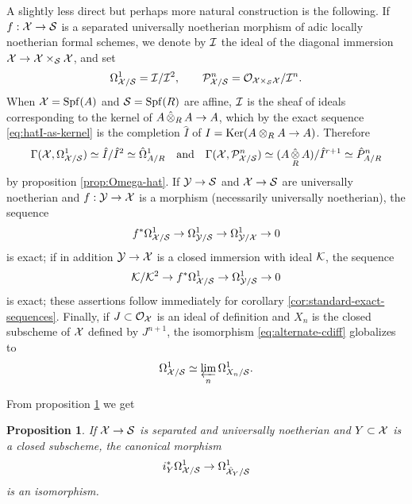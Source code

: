 \documentclass{article}
\theoremstyle{change}
\newtheorem{prop}[subsubsection]{Proposition}
\numberwithin{equation}{subsubsection}
\newcommand{\demobox}{\vrule height6pt width6pt depth0pt}
\newcommand{\nodemo}{\unskip\nobreak\hfil\qquad
\demobox\parfillskip=0pt\par}
\newcommand\hP{\hat P}
\newcommand\hI{\hat I}
\begin{document}
A slightly less direct but perhaps more natural construction is the
following. If $f:{\cal X}\to{\cal S}$ is a separated universally noetherian
morphism of adic locally noetherian formal schemes, we denote by ${\cal I}$
the ideal of the diagonal immersion ${\cal X}\to{\cal X}\times_{\cal S}{\cal X}$, and set
\begin{equation}
  \label{eq:global-diff-and-principal-parts}
  \Omega^1_{{\cal X}/{\cal S}}={\cal I}/{\cal I}^2,\qquad
  {\cal P}^n_{{\cal X}/{\cal S}}={\cal O}_{{\cal X}\times_{\cal S}{\cal X}}/{\cal I}^n.
\end{equation}
When
${\cal X}={\operatorname{Spf}({A})}$ and ${\cal S}={\operatorname{Spf}({R})}$ are affine, ${\cal I}$ is the sheaf of
ideals corresponding to the kernel of $A\mathop{\hat\otimes}_RA\to A$, which by the
exact sequence \ref{eq:hatI-as-kernel} is the completion $\hI$ of
$I={\operatorname{Ker}}(A\otimes_RA\to A)$. Therefore
\begin{displaymath}
  \Gamma(\cX,\diff_{\cX/\cS})\simeq\hI/\hI^2\simeq\cdiff_{A/R}
  \quad\text{and}\quad
  \Gamma(\cX,\cP^n_{\cX/\cS})\simeq(A\ctens_RA)/\hI^{r+1}
  \simeq\hP^n_{A/R}
\end{displaymath}
by proposition \ref{prop:Omega-hat}. If ${\cal Y}\to{\cal S}$ and ${\cal X}\to{\cal S}$
are universally noetherian and $f:{\cal Y}\to{\cal X}$ is a morphism
(necessarily universally noetherian), the sequence
\begin{equation}
  \label{eq:std-exact-sequence-completed-3}
  f^*\Omega^1_{{\cal X}/{\cal S}}\to\Omega^1_{{\cal Y}/{\cal S}}\to\Omega^1_{{\cal Y}/{\cal X}}\to0
\end{equation}
is exact; if in addition ${\cal Y}\to{\cal X}$ is a closed immersion with ideal
${\cal K}$, the sequence
\begin{equation}
  \label{eq:std-exact-sequence-completed-4}
  {\cal K}/{\cal K}^2\to f^*\Omega^1_{{\cal X}/{\cal S}}\to\Omega^1_{{\cal Y}/{\cal S}}\to0
\end{equation}
is exact; these assertions follow immediately for corollary
\ref{cor:standard-exact-sequences}. Finally, if $J\subset{\cal O}_{\cal X}$ is an
ideal of definition and $X_n$ is the closed subscheme of ${\cal X}$ defined
by $J^{n+1}$, the isomorphism \ref{eq:alternate-cdiff} 
globalizes to
\begin{equation}
  \label{eq:alternate-diff-global}
  \Omega^1_{{\cal X}/{\cal S}}\simeq\varprojlim_n\Omega^1_{X_n/{\cal S}}.
\end{equation}

From proposition \ref{prop:diff-of-completions} we get

\begin{prop}\label{prop:diff-of-completions}
  If ${\cal X}\to{\cal S}$ is separated and universally noetherian and
  $Y\subset{\cal X}$ is a closed subscheme, the canonical
  morphism
  \begin{displaymath}
    i_Y^*\Omega^1_{{\cal X}/{\cal S}}\to\Omega^1_{\hat{{\cal X}}_Y/{\cal S}}
  \end{displaymath}
  is an isomorphism.\nodemo
\end{prop}
\end{document}
